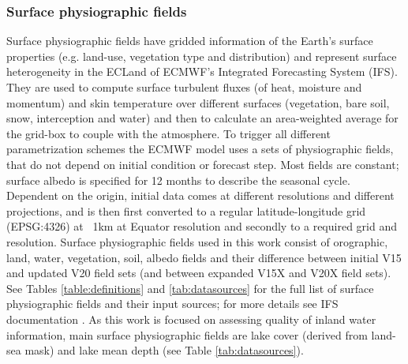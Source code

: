 \documentclass[hess, twostagejnl]{copernicus}
\begin{document}
\subsubsection{Surface physiographic fields}\label{sec:surface_physio}
\noindent Surface physiographic fields have gridded information of the Earth’s surface properties (e.g. land-use, vegetation type and distribution) and represent surface heterogeneity in the ECLand of ECMWF’s Integrated Forecasting System (IFS). They are used to compute surface turbulent fluxes (of heat, moisture and momentum) and skin temperature over different surfaces (vegetation, bare soil, snow, interception and water) and then to calculate an area-weighted average for the grid-box to couple with the atmosphere. To trigger all different parametrization schemes the ECMWF model uses a sets of physiographic fields, that do not depend on initial condition or forecast step. Most fields are constant; surface albedo is specified for 12 months to describe the seasonal cycle. Dependent on the origin, initial data comes at different resolutions and different projections, and is then first converted to a regular latitude-longitude grid (EPSG:4326) at ~1km at Equator resolution and secondly to a required grid and resolution. Surface physiographic fields used in this work consist of orographic, land, water, vegetation, soil, albedo fields and their difference between initial V15 and updated V20 field sets (and between expanded V15X and V20X field sets). See Tables \ref{table:definitions} and \ref{tab:datasources} for the full list of surface physiographic fields and their input sources; for more details see IFS documentation \citep{IFSdocs}. As this work is focused on assessing quality of inland water information, main surface physiographic fields are lake cover (derived from land-sea mask) and lake mean depth (see Table \ref{tab:datasources}).  \newline 
\end{document}
